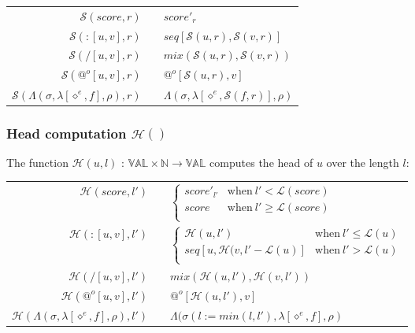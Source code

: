 \documentclass[10pt,a4paper,frenchb]{article}
\makeatletter
\newcommand{\var}[1]{\diamond^#1}
\newcommand{\val}{\mathbb{VAL}}
\newcommand{\closure}{\Lambda}
\newcommand{\noredex}{@^o}
\newcommand{\bdomain}[3]{$#1 \times #2 \rightarrow #3$}
\newcommand{\envsym}{\rho}
\newcommand{\closenv}[3][\var{e}]{\closure(#3,\lambda[#1,#2],\envsym)}
\newcommand{\seq}			{:}
\newcommand{\length}		{{\mathcal L}}
\newcommand{\head}			{{\mathcal H}}
\renewcommand{\stretch}	{{\mathcal S}}
\newcommand{\bounds}		{\sigma}
\makeatother
\begin{document}
\begin{center}
\begin{tabular*}{12cm}{rc@{ $\rightarrow$ }l}
 \hline
 $\stretch(score,r)$				& & $score'_r$\\
 $\stretch(\seq [u,v],r)$			& & $seq[\stretch(u, r), \stretch(v, r)]$ \\
 $\stretch(/ [u,v],r)$ 			& & $mix(\stretch(u, r), \stretch(v, r))$ \\
 $\stretch(\noredex [u,v],r)$ 	& & $\noredex[\stretch(u,r),v]$ \\
 $\stretch(\closenv{f}{\bounds},r)$ 	& & $\closenv{\stretch(f,r)}{\bounds}$ \\
 \hline
\end{tabular*}
\end{center}

\subsubsection{Head computation $\head()$}
The function $\head(u,l)$ :  \bdomain{\val}{\mathbb{N}}{\val} computes the head of $u$ over the length $l$:

\begin{center}
\begin{tabular*}{12cm}{rc@{ $\rightarrow$ }l}
 \hline
 $\head(score,l')$				& & $\left\{ \begin{array}{ll}
 								score'_{l'} & \mathrm{when} \  l' < \length(score) \\
								score & \mathrm{when} \  l' \geq \length(score) \\
	 							\end{array} \right.$ \\
 $\head(\seq [u,v],l')$		& & $\left\{ \begin{array}{ll}
 								\head(u,l') & \mathrm{when} \  l' \leq \length(u) \\
								seq[u, \head(v, l'-\length(u)] & \mathrm{when} \  l' > \length(u) \\
	 							\end{array} \right.$ \\
 $\head(/ [u,v],l')$ 			& & $mix(\head(u, l'), \head(v, l'))$ \\
 $\head(\noredex [u,v],l')$ 	& & $\noredex[\head(u,l'),v]$ \\
 $\head(\closenv{f}{\bounds},l')$ 	& &  $\closenv{f}{\bounds(l:= min(l,l')}$ \\
 \hline
\end{tabular*}
\end{center}
\end{document}
